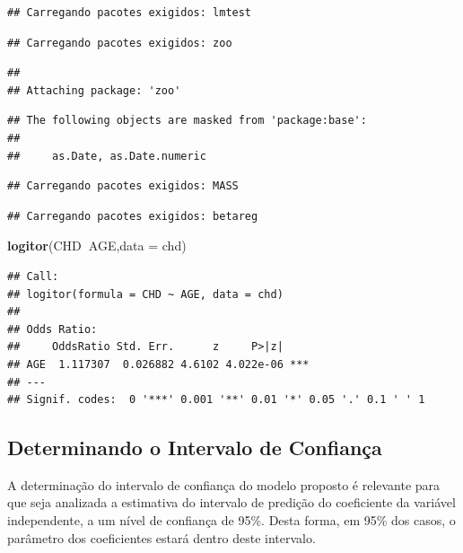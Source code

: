 \documentclass[12pt,brazil,]{book}
\newenvironment{Shaded}{\begin{snugshade}}{\end{snugshade}}
\newcommand{\DataTypeTok}[1]{\textcolor[rgb]{0.13,0.29,0.53}{#1}}
\newcommand{\KeywordTok}[1]{\textcolor[rgb]{0.13,0.29,0.53}{\textbf{#1}}}
\newcommand{\NormalTok}[1]{#1}
\newcommand{\OperatorTok}[1]{\textcolor[rgb]{0.81,0.36,0.00}{\textbf{#1}}}
\begin{document}
\begin{verbatim}
## Carregando pacotes exigidos: lmtest
\end{verbatim}

\begin{verbatim}
## Carregando pacotes exigidos: zoo
\end{verbatim}

\begin{verbatim}
## 
## Attaching package: 'zoo'
\end{verbatim}

\begin{verbatim}
## The following objects are masked from 'package:base':
## 
##     as.Date, as.Date.numeric
\end{verbatim}

\begin{verbatim}
## Carregando pacotes exigidos: MASS
\end{verbatim}

\begin{verbatim}
## Carregando pacotes exigidos: betareg
\end{verbatim}

\begin{Shaded}
\begin{Highlighting}[]
\KeywordTok{logitor}\NormalTok{(CHD}\OperatorTok{~}\NormalTok{AGE,}\DataTypeTok{data =}\NormalTok{ chd)}
\end{Highlighting}
\end{Shaded}

\begin{verbatim}
## Call:
## logitor(formula = CHD ~ AGE, data = chd)
## 
## Odds Ratio:
##     OddsRatio Std. Err.      z     P>|z|    
## AGE  1.117307  0.026882 4.6102 4.022e-06 ***
## ---
## Signif. codes:  0 '***' 0.001 '**' 0.01 '*' 0.05 '.' 0.1 ' ' 1
\end{verbatim}

\hypertarget{determinando-o-intervalo-de-confianca}{%
\subsection{Determinando o Intervalo de
Confiança}\label{determinando-o-intervalo-de-confianca}}

A determinação do intervalo de confiança do modelo proposto é relevante
para que seja analizada a estimativa do intervalo de predição do
coeficiente da variável independente, a um nível de confiança de 95\%.
Desta forma, em 95\% dos casos, o parâmetro dos coeficientes estará
dentro deste intervalo.
\end{document}
